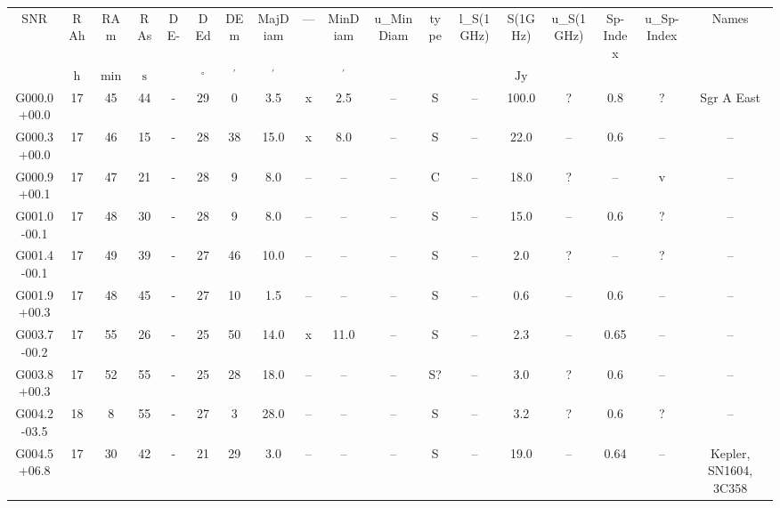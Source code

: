 \begin{table}
\begin{tabular}{cccccccccccccccccc}
SNR & RAh & RAm & RAs & DE- & DEd & DEm & MajDiam & --- & MinDiam & u_MinDiam & type & l_S(1GHz) & S(1GHz) & u_S(1GHz) & Sp-Index & u_Sp-Index & Names \\
 & $\mathrm{h}$ & $\mathrm{min}$ & $\mathrm{s}$ &  & $\mathrm{{}^{\circ}}$ & $\mathrm{{}^{\prime}}$ & $\mathrm{{}^{\prime}}$ &  & $\mathrm{{}^{\prime}}$ &  &  &  & $\mathrm{Jy}$ &  &  &  &  \\
G000.0+00.0 & 17 & 45 & 44 & - & 29 & 0 & 3.5 & x & 2.5 & -- & S & -- & 100.0 & ? & 0.8 & ? & Sgr A East \\
G000.3+00.0 & 17 & 46 & 15 & - & 28 & 38 & 15.0 & x & 8.0 & -- & S & -- & 22.0 & -- & 0.6 & -- & -- \\
G000.9+00.1 & 17 & 47 & 21 & - & 28 & 9 & 8.0 & -- & -- & -- & C & -- & 18.0 & ? & -- & v & -- \\
G001.0-00.1 & 17 & 48 & 30 & - & 28 & 9 & 8.0 & -- & -- & -- & S & -- & 15.0 & -- & 0.6 & ? & -- \\
G001.4-00.1 & 17 & 49 & 39 & - & 27 & 46 & 10.0 & -- & -- & -- & S & -- & 2.0 & ? & -- & ? & -- \\
G001.9+00.3 & 17 & 48 & 45 & - & 27 & 10 & 1.5 & -- & -- & -- & S & -- & 0.6 & -- & 0.6 & -- & -- \\
G003.7-00.2 & 17 & 55 & 26 & - & 25 & 50 & 14.0 & x & 11.0 & -- & S & -- & 2.3 & -- & 0.65 & -- & -- \\
G003.8+00.3 & 17 & 52 & 55 & - & 25 & 28 & 18.0 & -- & -- & -- & S? & -- & 3.0 & ? & 0.6 & -- & -- \\
G004.2-03.5 & 18 & 8 & 55 & - & 27 & 3 & 28.0 & -- & -- & -- & S & -- & 3.2 & ? & 0.6 & ? & -- \\
G004.5+06.8 & 17 & 30 & 42 & - & 21 & 29 & 3.0 & -- & -- & -- & S & -- & 19.0 & -- & 0.64 & -- & Kepler, SN1604, 3C358 \\
\end{tabular}
\end{table}
